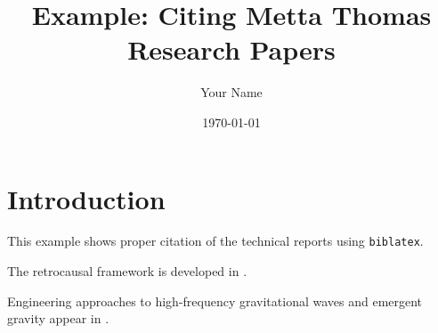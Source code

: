 \documentclass[11pt,a4paper]{article}
\title{Example: Citing Metta Thomas Research Papers}
\author{Your Name}
\date{\today}
\begin{document}
\maketitle

\section{Introduction}

This example shows proper citation of the technical reports using \texttt{biblatex}.

The retrocausal framework is developed in \cite{Thomas2026TeleologicalAttractor}.

Engineering approaches to high-frequency gravitational waves and emergent gravity
appear in \cite{Thomas2026EmergentGravity}.

\printbibliography[title={References}]
\end{document}

